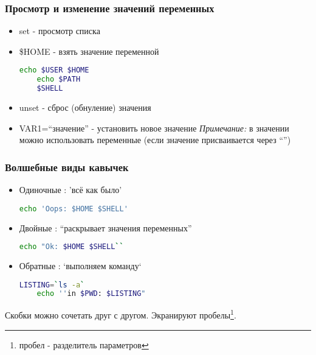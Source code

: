 \begin{frame}[fragile]
  \frametitle{Просмотр и изменение значений переменных}
  \normalsize{ }
  \begin{itemize}
    \item \alert{set} - просмотр списка \pause
    \item \alert{\$HOME} - взять значение переменной \pause
      \begin{lstlisting}[language=sh,frame=single]
	echo $USER $HOME
	echo $PATH 
	$SHELL
      \end{lstlisting} \pause 
    \item \alert{unset} - сброс (обнуление) значения \pause
    \item \alert{VAR1=``значение''} - установить новое значение \newline 
      \emph{Примечание:} в значении можно использовать переменные (если значение присваивается через ``'')
  \end{itemize}

\end{frame}

\begin{frame}[fragile]
  \frametitle{Волшебные виды кавычек}

  \begin{itemize}
    \item \alert{Одиночные} : 'всё как было'  \newline
      \begin{lstlisting}[language=sh,frame=single]
	echo 'Oops: $HOME $SHELL'
      \end{lstlisting} \pause
    \item \alert{Двойные} :  ``раскрывает значения переменных'' \newline
      \begin{lstlisting}[language=sh,frame=single]
	echo "Ok: $HOME $SHELL``
      \end{lstlisting} \pause
    \item \alert{Обратные} : `выполняем команду` \newline
      \begin{lstlisting}[language=sh,frame=single]
	LISTING=`ls -a`
	echo ''in $PWD: $LISTING"
      \end{lstlisting}
  \end{itemize}
  Скобки можно сочетать друг с другом. Экранируют пробелы\footnote{пробел - разделитель параметров}.
\end{frame}

